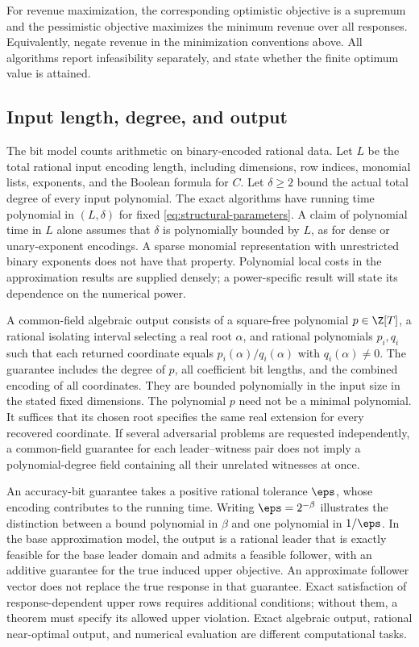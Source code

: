 For revenue maximization, the corresponding optimistic objective is a
supremum and the pessimistic objective maximizes the minimum revenue over
all responses. Equivalently, negate revenue in the minimization
conventions above. All algorithms report infeasibility separately, and
state whether the finite optimum value is attained.

\subsection{Input length, degree, and output}\label{subsec:encoding}

The bit model counts arithmetic on binary-encoded rational data. Let $L$
be the total rational input encoding length, including dimensions, row
indices, monomial lists, exponents, and the Boolean formula for $C$.
Let $\delta\ge2$ bound the actual total degree of every input polynomial.
The exact algorithms have running time polynomial in $(L,\delta)$ for
fixed \eqref{eq:structural-parameters}. A claim of polynomial time in $L$
alone assumes that $\delta$ is polynomially bounded by $L$, as for dense
or unary-exponent encodings. A sparse monomial representation with
unrestricted binary exponents does not have that property. Polynomial
local costs in the approximation results are supplied densely; a
power-specific result will state its dependence on the numerical power.

A common-field algebraic output consists of a square-free polynomial
$p\in\Z[T]$, a rational isolating interval selecting a real root
$\alpha$, and rational polynomials $p_i,q_i$ such that each returned
coordinate equals $p_i(\alpha)/q_i(\alpha)$ with $q_i(\alpha)\ne0$.
The guarantee includes the degree of $p$, all coefficient bit lengths,
and the combined encoding of all coordinates. They are bounded
polynomially in the input size in the stated fixed dimensions. The
polynomial $p$ need not be a minimal polynomial. It suffices that its
chosen root specifies the same real extension for every recovered
coordinate. If several adversarial problems are requested independently,
a common-field guarantee for each leader--witness pair does not imply a
polynomial-degree field containing all their unrelated witnesses at once.

An accuracy-bit guarantee takes a positive rational tolerance $\eps$,
whose encoding contributes to the running time. Writing $\eps=2^{-\beta}$
illustrates the distinction between a bound polynomial in $\beta$ and
one polynomial in $1/\eps$. In the base approximation model, the output
is a rational leader that is exactly feasible for the base leader domain
and admits a feasible follower, with an additive guarantee for the true
induced upper objective. An approximate follower vector does not replace
the true response in that guarantee. Exact satisfaction of
response-dependent upper rows requires additional conditions; without
them, a theorem must specify its allowed upper violation. Exact
algebraic output, rational near-optimal output, and numerical evaluation
are different computational tasks.


